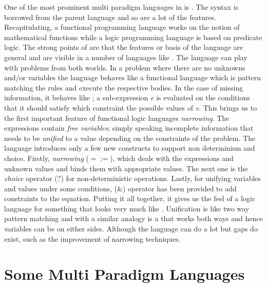 \documentclass[thesis-solanki.tex]{subfiles}
\begin{document}
One of the most prominent multi paradigm languages in  is 
\cite{antoy2010functional}.
The syntax is borrowed from the parent language and so are a lot of the features.
Recapitulating, a functional programming language works on the notion of mathematical functions while a logic
programming language is based on predicate logic.
The strong points of  are that the features or basis of the language are general and are visible in
a number of languages like \cite{website:toy}.
The language can play with problems from both worlds.
In a problem where there are no unknowns and/or variables the language behaves like a functional language which is
pattern matching the rules and execute the respective bodies.
In the case of missing information, it behaves like ; a sub-expression \textit{e} is evaluated on
the conditions that it should satisfy which constraint the possible values of \textit{e}.
This brings us to the first important feature of functional logic languages \textit{narrowing}.
The expressions contain \textit{free variables}; simply speaking incomplete information that needs to be
\textit{unified} to a value depending on the constraints of the problem.
The language introduces only a few new constructs to support non determinism and choice.
Firstly, \textit{narrowing} ($\mathtt{=:=}$), which deals with the expressions and unknown values and binds them
with appropriate values.
The next one is the \textit{choice} operator ($\mathtt{?}$) for non-deterministic operations.
Lastly, for unifying variables and values under some conditions, ($\mathtt{\&}$) operator has been provided to add
constraints to the equation.
Putting it all together, it gives us the feel of a logic language for something that looks very much like
.
Unification is like two way pattern matching and with a similar analogy  is a 
that works both ways and hence variables can be on either sides.
Although the language can do a lot but gaps do exist, such as the improvement of narrowing techniques.
 
 

\section{Some Multi Paradigm Languages}
\end{document}
